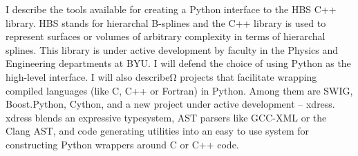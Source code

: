I describe the tools available for creating a Python interface to the HBS C++ library. HBS stands for hierarchal B-splines and the C++ library is used to represent surfaces or volumes of arbitrary complexity in terms of hierarchal splines. This library is under active development by faculty in the Physics and Engineering departments at BYU. I will defend the choice of using Python as the high-level interface. I will also describeΩ projects that facilitate wrapping compiled languages (like C, C++ or Fortran) in Python. Among them are SWIG, Boost.Python, Cython, and a new project under active development -- xdress. xdress blends an expressive typesystem, AST parsers like GCC-XML or the Clang AST, and code generating utilities into an easy to use system for constructing Python wrappers around C or C++ code.
